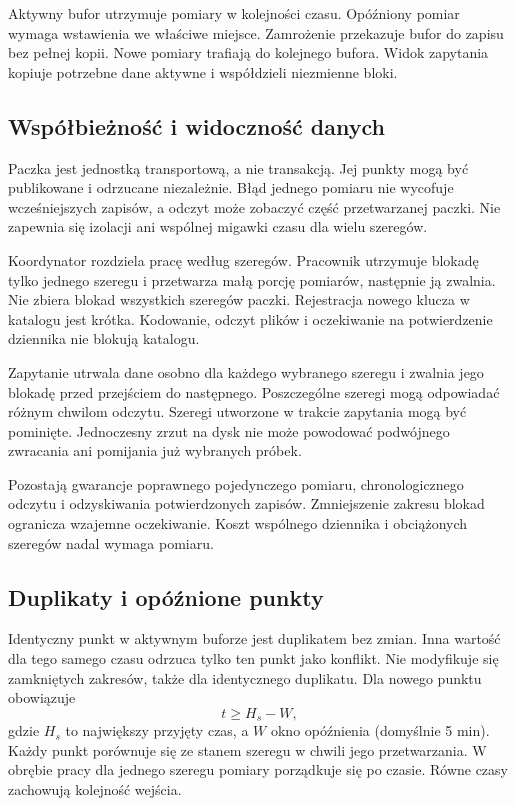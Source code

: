 \documentclass[11pt,a4paper]{article}
\begin{document}
Aktywny bufor utrzymuje pomiary w kolejności czasu. Opóźniony pomiar
wymaga wstawienia we właściwe miejsce. Zamrożenie przekazuje bufor
do zapisu bez pełnej kopii. Nowe pomiary trafiają do kolejnego bufora.
Widok zapytania kopiuje potrzebne dane aktywne i współdzieli niezmienne bloki.

\subsection{Współbieżność i widoczność danych}
\label{sec:concurrency}
Paczka jest jednostką transportową, a nie transakcją. Jej punkty mogą
być publikowane i odrzucane niezależnie. Błąd jednego pomiaru nie wycofuje
wcześniejszych zapisów, a odczyt może zobaczyć część przetwarzanej paczki.
Nie zapewnia się izolacji ani wspólnej migawki czasu dla wielu szeregów.

Koordynator rozdziela pracę według szeregów. Pracownik utrzymuje blokadę
tylko jednego szeregu i przetwarza małą porcję pomiarów, następnie ją zwalnia.
Nie zbiera blokad wszystkich szeregów paczki. Rejestracja nowego klucza
w katalogu jest krótka. Kodowanie, odczyt plików i oczekiwanie na
potwierdzenie dziennika nie blokują katalogu.

Zapytanie utrwala dane osobno dla każdego wybranego szeregu i zwalnia
jego blokadę przed przejściem do następnego. Poszczególne szeregi mogą
odpowiadać różnym chwilom odczytu. Szeregi utworzone w trakcie zapytania
mogą być pominięte. Jednoczesny zrzut na dysk nie może powodować
podwójnego zwracania ani pomijania już wybranych próbek.

Pozostają gwarancje poprawnego pojedynczego pomiaru, chronologicznego
odczytu i odzyskiwania potwierdzonych zapisów. Zmniejszenie zakresu blokad
ogranicza wzajemne oczekiwanie. Koszt wspólnego dziennika i obciążonych
szeregów nadal wymaga pomiaru.

\subsection{Duplikaty i opóźnione punkty}
Identyczny punkt w aktywnym buforze jest duplikatem bez zmian.
Inna wartość dla tego samego czasu odrzuca tylko ten punkt jako konflikt.
Nie modyfikuje się zamkniętych zakresów, także dla identycznego duplikatu.
Dla nowego punktu obowiązuje
\[
  t\geq H_s-W,
\]
gdzie $H_s$ to największy przyjęty czas,
a $W$ okno opóźnienia (domyślnie 5 min).
Każdy punkt porównuje się ze stanem szeregu w chwili jego przetwarzania.
W obrębie pracy dla jednego szeregu pomiary porządkuje się po czasie.
Równe czasy zachowują kolejność wejścia.
\end{document}
